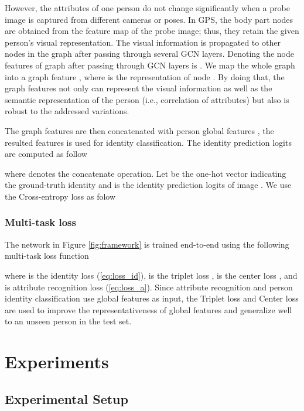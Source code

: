 \documentclass[final]{cvpr}
\begin{document}
However, the attributes of one person do not change significantly when a probe image is captured from different cameras or poses. In GPS, the body part nodes are obtained from the feature map of the probe image; thus, they retain the given person's visual representation. The visual information is propagated to other nodes in the graph after passing through several GCN layers. Denoting the node features of graph  after passing through  GCN layers is . We map the whole graph into a graph feature , where  is the representation of node . By doing that, the graph features  not only can represent the visual information as well as the semantic representation of the person (i.e., correlation of attributes) but also is robust to the addressed variations.

The graph features are then concatenated with person global features , the resulted features is used for identity classification. The identity prediction logits are computed as follow

where  denotes the concatenate operation. Let  be the one-hot vector indicating the ground-truth identity and  is the identity prediction logits of image . We use the Cross-entropy loss as folow






\subsubsection{Multi-task loss}
The network in Figure \ref{fig:framework} is trained end-to-end using the following multi-task loss function

where  is the identity loss (\ref{eq:loss_id}),  is the triplet loss \cite{weinberger2006distance},  is the center loss \cite{centerloss}, and  is attribute recognition loss (\ref{eq:loss_a}). Since attribute recognition and person identity classification use global features as input, the Triplet loss and Center loss are used to improve the representativeness of global features and generalize well to an unseen person in the test set.

\section{Experiments}
\label{sec:exp}
\subsection{Experimental Setup}
\end{document}
